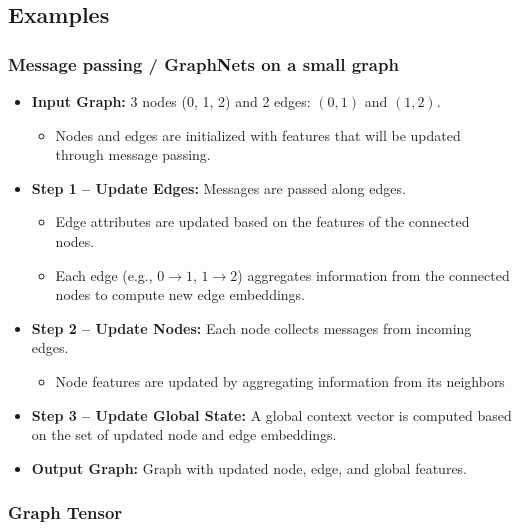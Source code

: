 \subsection{Examples}
\subsubsection{Message passing / GraphNets on a small graph}
\begin{example}
    \begin{itemize}
        \item \textbf{Input Graph:} 3 nodes (0, 1, 2) and 2 edges: $(0,1)$ and $(1,2)$.
        \begin{itemize}
            \item Nodes and edges are initialized with features that will be updated through message passing.
        \end{itemize}
    
        \item \textbf{Step 1 – Update Edges:} Messages are passed along edges.
        \begin{itemize}
            \item Edge attributes are updated based on the features of the connected nodes.
            \item Each edge (e.g., $0 \rightarrow 1$, $1 \rightarrow 2$) aggregates information from the connected nodes to compute new edge embeddings.
        \end{itemize}
    
        \item \textbf{Step 2 – Update Nodes:} Each node collects messages from incoming edges.
        \begin{itemize}
            \item Node features are updated by aggregating information from its neighbors
        \end{itemize}
    
        \item \textbf{Step 3 – Update Global State:} A global context vector is computed based on the set of updated node and edge embeddings.
    
        \item \textbf{Output Graph:} Graph with updated node, edge, and global features.
    \end{itemize}    
\end{example}
\newpage

\subsubsection{Graph Tensor}
\begin{example}
\end{example}
\newpage

